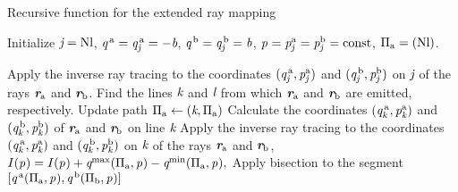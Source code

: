 \begin{algorithm}
\caption{Recursive function for the extended ray mapping}\label{alg:recursiveraymapping}
Initialize $\textit{j} = \textrm{Nl}$, $\textit{q}^{\,\textrm{a}}= \textit{q}^{\,\textrm{a}}_{\textit{j}}=-\textit{b}$, $\textit{q}^{\,\textrm{b}}= \textit{q}^{\,\textrm{b}}_{\textit{j}}=\textit{b}$, $\textit{p}_{\textrm{} \textit{}}=\textit{p}^{\textrm{a}}_{\textit{j}}=\textit{p}^{\textrm{b}}_{\textit{j}}=\textrm{const}$, $\Pi_{\textrm{a}}=({\textrm{Nl}})$.
\begin{algorithmic}[1]
\State Apply the inverse ray tracing to the coordinates $(\textit{q}^{\,\textrm{a}}_{\textit{j}},\textit{p}^{\textrm{a}}_{\textit{j}})$ and $(\textit{q}^{\,\textrm{b}}_{\textit{j}},\textit{p}^{\textrm{b}}_{\textit{j}})$ on $\textit{j}$ of the rays $\textit{\textbf{r}}_{\textrm{a}}$ and $\textit{\textbf{r}}_{\textrm{b}}$.
\State Find the lines $\textit{k}$ and $\textit{l}$ from which $\textit{\textbf{r}}_{\textrm{a}}$ and $\textit{\textbf{r}}_{\textrm{b}}$ are emitted, respectively.
\State Update path $\Pi_{\textrm{a}}\gets(\textit{k}, \Pi_{\textrm{a}})$
\State Calculate the coordinates $(\textit{q}^{\,\textrm{a}}_{\textit{k}},\textit{p}^{\textrm{a}}_{\textit{k}})$ and $(\textit{q}^{\,\textrm{b}}_{\textit{k}}, \textit{p}^{\textrm{b}}_{\textit{k}})$ of $\textit{\textbf{r}}_{\textrm{a}}$ and $\textit{\textbf{r}}_{\textrm{b}}$ on line $\textit{k}$
\If {$\lineaj = \lineak$}
\State Apply the inverse ray tracing to the coordinates $(\textit{q}^{\,\textrm{a}}_{\textit{k}},\textit{p}^{\textrm{a}}_{\textit{k}})$ and $(\textit{q}^{\,\textrm{b}}_{\textit{k}}, \textit{p}^{\textrm{b}}_{\textit{k}})$ on $\textit{k}$ of the rays $\textit{\textbf{r}}_{\textrm{a}}$ and $\textit{\textbf{r}}_{\textrm{b}}$,
\State{}
\Else 
$I(\textit{p}_{\textrm{} \textit{}}) = I(\textit{p}_{\textrm{} \textit{}})+\textit{q}^{\textrm{max}}(\Pi_{\textrm{a}}, \textit{p}_{\textrm{} \textit{}})
-\textit{q}^{\textrm{min}}(\Pi_{\textrm{a}}, \textit{p}_{\textrm{} \textit{}}),$
\EndIf
\Else 
\State Apply bisection to the segment $[\textit{q}^{\,\textrm{a}}(\Pi_\textrm{a}, \textit{p}_{\textrm{} \textit{}}), \textit{q}^{\,\textrm{b}}(\Pi_\textrm{b}, \textit{p}_{\textrm{} \textit{}})]$

\end{algorithmic}
\end{algorithm}
